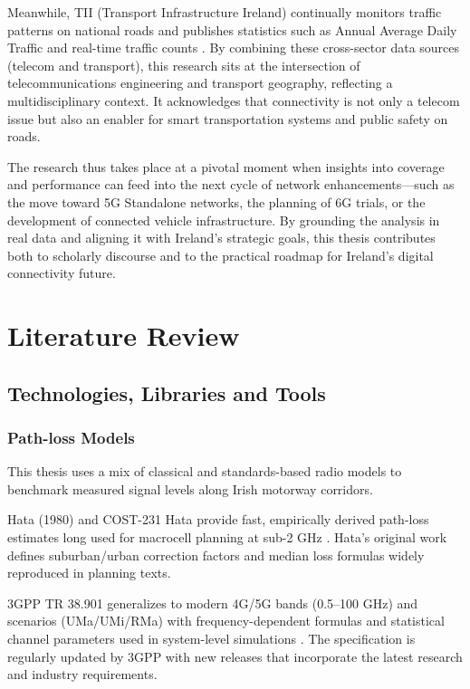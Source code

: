 \documentclass[MScCS]{uccthesis}
\begin{document}
Meanwhile, TII (Transport Infrastructure Ireland) continually monitors traffic patterns on national roads and publishes statistics such as Annual Average Daily Traffic and real-time traffic counts \cite{tii2024indicators}. By combining these cross-sector data sources (telecom and transport), this research sits at the intersection of telecommunications engineering and transport geography, reflecting a multidisciplinary context. It acknowledges that connectivity is not only a telecom issue but also an enabler for smart transportation systems and public safety on roads.

The research thus takes place at a pivotal moment when insights into coverage and performance can feed into the next cycle of network enhancements---such as the move toward 5G Standalone networks, the planning of 6G trials, or the development of connected vehicle infrastructure. By grounding the analysis in real data and aligning it with Ireland's strategic goals, this thesis contributes both to scholarly discourse and to the practical roadmap for Ireland's digital connectivity future.


\chapter{Literature Review}

\section{Technologies, Libraries and Tools}

\subsection{Path-loss Models}

This thesis uses a mix of classical and standards-based radio models to benchmark measured signal levels along Irish motorway corridors.

Hata (1980) and COST-231 Hata provide fast, empirically derived path-loss estimates long used for macrocell planning at sub-2 GHz \cite{hata1980empirical, cost231}. Hata's original work defines suburban/urban correction factors and median loss formulas widely reproduced in planning texts.

3GPP TR 38.901 generalizes to modern 4G/5G bands (0.5--100 GHz) and scenarios (UMa/UMi/RMa) with frequency-dependent formulas and statistical channel parameters used in system-level simulations \cite{3gpp2024channel}. The specification is regularly updated by 3GPP with new releases that incorporate the latest research and industry requirements.
\end{document}
